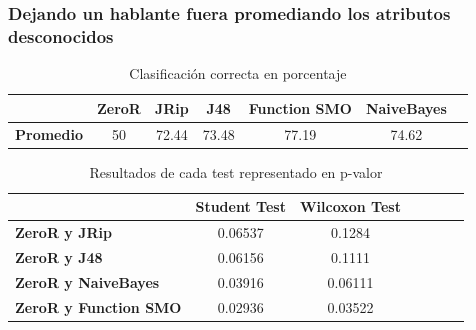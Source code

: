\documentclass[mathserif]{beamer}%
\begin{document}
\begin{frame}
	\frametitle{Dejando un hablante fuera promediando los atributos desconocidos}
	
	\begin{table}[H]
		\centering
		\begin{tabular}{|l|c|c|c|c|c|c|}
			\hline
			\textbf{}  & \textbf{ZeroR} & \textbf{JRip} & \textbf{J48} & \textbf{Function SMO} & \textbf{NaiveBayes} \\ \hline
			\textbf{Promedio} & 50 & 72.44 & 73.48 & 77.19 & 74.62 \\ \hline
		\end{tabular}
		\caption{Clasificación correcta en porcentaje}
		\label{class_corr_en_pct}
	\end{table}	
	
	\begin{table}[H]
		\centering
		\begin{tabular}{|l|c|c|c|c|c|c|}
			\hline
			\textbf{}  & \textbf{Student Test} & \textbf{Wilcoxon Test} \\ \hline
			\textbf{ZeroR y JRip}  & 0.06537 & 0.1284 \\ \hline
			\textbf{ZeroR y J48}  & 0.06156 &  0.1111 \\ \hline
			\textbf{ZeroR y NaiveBayes}  & 0.03916 & 0.06111 \\ \hline
			\textbf{ZeroR y Function SMO}  &  0.02936 & 0.03522 \\ \hline
		\end{tabular}
		\caption{Resultados de cada test representado en p-valor}
		\label{res_tests_wilcoxon_student}
	\end{table}
		
\end{frame}
\end{document}
